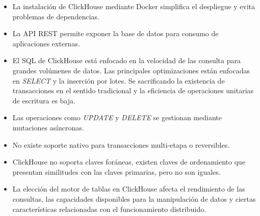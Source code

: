 \begin{itemize}
    \item La instalación de ClickHouse mediante Docker simplifica el despliegue y evita problemas de dependencias.  
    \item La API REST permite exponer la base de datos para consumo de aplicaciones externas.
    \item El SQL de ClickHouse está enfocado en la velocidad de las consulta para grandes volúmenes de datos. Las principales optimizaciones están enfocadas en \emph{SELECT} y la inserción por lotes. Se sacrificando la existencia de transacciones en el sentido tradicional y la eficiencia de operaciones unitarias de escritura es baja.
    \item Las operaciones como \emph{UPDATE} y \emph{DELETE} se gestionan mediante mutaciones asíncronas.
    \item No existe soporte nativo para transacciones multi-etapa o reversibles.
    \item ClickHouse no soporta claves foráneas, existen claves de ordenamiento que presentan similitudes con las claves primarias, pero no son iguales.  
    \item La elección del motor de tablas en ClickHouse afecta el rendimiento de las consultas, las capacidades disponibles para la manipulación de datos y ciertas características relacionadas con el funcionamiento distribuido. 

\end{itemize}